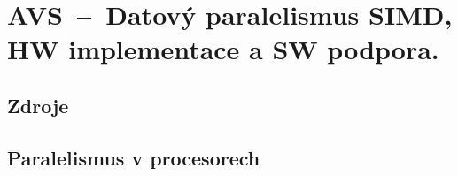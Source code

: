 

\graphicspath{{avs/datovy_paralelismus/figures}}


\chapter{AVS~--~Datový paralelismus SIMD, HW implementace a SW podpora.}


\section{Zdroje}

\begin{compactitem}
    \item {}
    \item {}
\end{compactitem}


\section{Paralelismus v procesorech}

